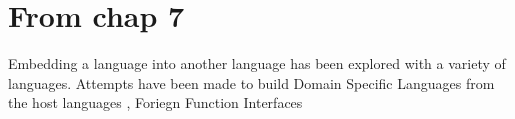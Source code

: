 \documentclass[thesis-solanki.tex]{subfiles}
\begin{document}
\begin{comment}
\section{Possibly Related Content}
\begin{enumerate}

\item Unifying Theories of Programming, C.A.R. Hoare,
\\* \url{http://www.unifyingtheories.org/}

\item Unifying Theories of Programming with Monads, Jeremy Gibbons,
\\* \url{http://www.cs.ox.ac.uk/people/jeremy.gibbons/publications/utp-monads.pdf}

\end{enumerate}
\end{comment}

\begin{comment}
\begin{description}
\item[$\bullet$]Concatenative Programming Libraries
\begin{enumerate}
	\item peg \cite{peg-lib}
\end{enumerate}

\item[$\bullet$]Constraint Programming and Constraint Handling Rules
\begin{enumerate}
	\item monadiccp \cite{monadiccp-lib}
	\item monadicccp-gecode \cite{monadiccp-gecode-lib}
	\item csp \cite{csp-lib}
	\item liquid fix point \cite{liquid-fix-point-lib}
\end{enumerate}
\end{description}
\end{comment}


\section{\textbf{From chap 7}}

Embedding a language into another language has been explored with a variety of languages. Attempts have been made to build Domain Specific Languages from the host languages \cite{hudak1996building}, Foriegn Function Interfaces \cite{barzilay2004foreign}
\end{document}
